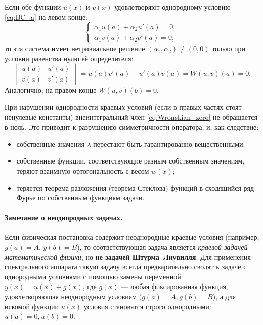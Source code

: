 \documentclass[12pt,a4paper]{article}
\begin{document}
Если обе функции $u(x)$ и $v(x)$ удовлетворяют однородному условию \eqref{eq:BC_a} на левом конце:
\begin{equation*}
    \begin{cases}
        \alpha_1 u(a) + \alpha_2 u'(a) = 0, \\
        \alpha_1 v(a) + \alpha_2 v'(a) = 0,
    \end{cases}
\end{equation*}
то эта система имеет нетривиальное решение $(\alpha_1, \alpha_2) \neq (0, 0)$ только при условии равенства нулю её определителя:
\begin{equation*}
    \begin{vmatrix} u(a) & u'(a) \\ v(a) & v'(a) \end{vmatrix} = u(a)v'(a) - u'(a)v(a) = W(u, v)(a) = 0.
\end{equation*}
Аналогично, на правом конце $W(u, v)(b) = 0$. 

При нарушении однородности краевых условий (если в правых частях стоят ненулевые константы) внеинтегральный член \eqref{eq:Wronskian_zero} не обращается в ноль. Это приводит к разрушению симметричности оператора, и, как следствие:
\begin{itemize}
    \item собственные значения $\lambda$ перестают быть гарантированно вещественными;
    \item собственные функции, соответствующие разным собственным значениям, теряют взаимную ортогональность с весом $w(x)$;
    \item теряется теорема разложения (теорема Стеклова) функций в сходящийся ряд Фурье по собственным функциям задачи.
\end{itemize}

\paragraph{Замечание о неоднородных задачах.}
Если физическая постановка содержит неоднородные краевые условия (например, $y(a) = A$, $y(b) = B$), то соответствующая задача является \textit{краевой задачей математической физики}, но \textbf{не задачей Штурма--Лиувилля}. Для применения спектрального аппарата такую задачу всегда предварительно сводят к задаче с однородными условиями с помощью замены переменной $y(x) = u(x) + g(x)$, где $g(x)$ — любая фиксированная функция, удовлетворяющая неоднородным условиям ($g(a)=A, g(b)=B$), а для искомой функции $u(x)$ условия становятся строго однородными: $u(a)=0, u(b)=0$.
\end{document}
